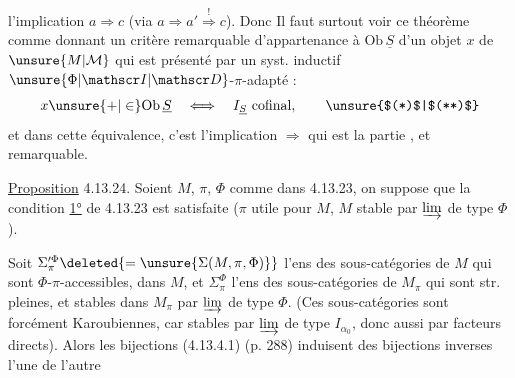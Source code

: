 
l'implication $a\Longrightarrow c$ (via $a\Rightarrow a'\overset{!}{\Rightarrow}c$). Donc Il faut surtout voir ce théorème comme donnant un critère remarquable d'appartenance à $\mathrm{Ob}\,\underline S$ d'un objet $x$ de $\unsure{M|\mathcal M}$ qui est présenté par un syst. inductif $\unsure{\Phi|\mathscr I|\mathscr D}$-$\pi$-adapté :
\[
x\unsure{+|\in}\mathrm{Ob}\,\underline S\quad\Longleftrightarrow\quad I_{\underline S}\text{ cofinal},\tag*{\unsure{$(*)$|$(**)$}}
\]
et dans cette équivalence, c'est l'implication $\Longrightarrow$ qui est la partie  , et remarquable.

\uline{Proposition} 4.13.24. Soient \deleted{\unsure{$\Phi$}}$M$, $\pi$, $\Phi$ comme dans 4.13.23, \unsure{$*$} on suppose que  la condition \uline{1°} de  4.13.23 est satisfaite ($\pi$ utile pour $M$, $M$ stable par $\varinjlim$ de type $\Phi$).


Soit $\Sigma_\pi^{\prime\Phi}\deleted{=\unsure{\Sigma(M,\pi,\Phi)}}$ l'ens des sous-catégories   de $M$ qui sont  $\Phi$-$\pi$-accessibles, dans $M$, et $\Sigma^{\Phi}_\pi$ l'ens des sous-catégories  de $M_\pi$ qui sont str. pleines,  et stables dans $M_\pi$ par $\varinjlim$ de type $\Phi$. (Ces sous-catégories sont forcément Karoubiennes, car  stables par $\varinjlim$ de type $I_{\alpha_0}$, donc aussi par facteurs directs). Alors les bijections (4.13.4.1) (p.  288) induisent des bijections inverses l'une de l'autre


